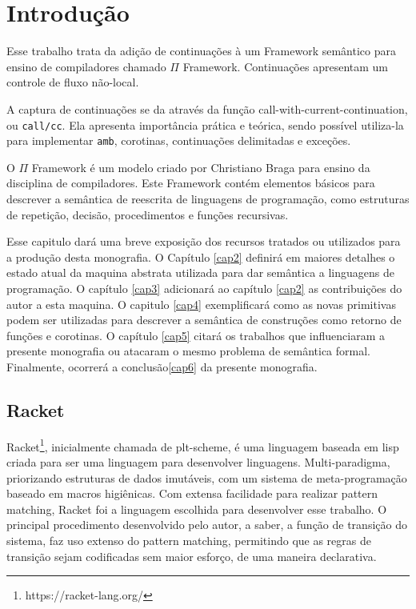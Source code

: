\chapter{Introdução}


Esse trabalho trata da adição de continuações à um Framework semântico para ensino de compiladores chamado $\Pi$ Framework. Continuações apresentam um controle de fluxo não-local.

A captura de continuações se da através da função call-with-current-continuation, ou \texttt{call/cc}. Ela apresenta importância prática e teórica, sendo possível utiliza-la para implementar \texttt{amb}, corotinas, continuações delimitadas e exceções.

O $\Pi$ Framework é um modelo criado por Christiano Braga para ensino da disciplina de compiladores. Este Framework contém elementos básicos para descrever a semântica de reescrita de linguagens de programação, como estruturas de repetição, decisão, procedimentos e funções recursivas.

Esse capitulo dará uma breve exposição dos recursos tratados ou utilizados para a produção desta monografia. O Capítulo \ref{cap2} definirá em maiores detalhes o estado atual da maquina abstrata utilizada para dar semântica a linguagens de programação. O capítulo \ref{cap3} adicionará ao capítulo \ref{cap2} as contribuições do autor a esta maquina. O capitulo \ref{cap4} exemplificará como as novas primitivas podem ser utilizadas para descrever a semântica de construções como retorno de funções e corotinas. O capítulo \ref{cap5} citará os trabalhos que influenciaram a presente monografia ou atacaram o mesmo problema de semântica formal. Finalmente, ocorrerá a conclusão\ref{cap6} da presente monografia.

\section{Racket}
Racket\footnote{https://racket-lang.org/}, inicialmente chamada de plt-scheme, é uma linguagem baseada em lisp criada para ser uma linguagem para desenvolver linguagens. Multi-paradigma, priorizando estruturas de dados imutáveis, com um sistema de meta-programação baseado em macros higiênicas. Com extensa facilidade para realizar pattern matching, Racket foi a linguagem escolhida para desenvolver esse trabalho. O principal procedimento desenvolvido pelo autor, a saber, a função de transição do sistema, faz uso extenso do pattern matching, permitindo que as regras de transição sejam codificadas sem maior esforço, de uma maneira declarativa.

